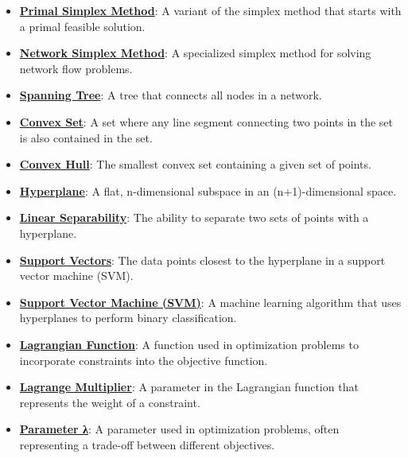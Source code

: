 \documentclass{article}%
\begin{document}
\begin{itemize}[leftmargin=*]
\item \href{https://www.math.purdue.edu/~yipn/421/2024-11-14-NetAppls.pdf#page=7}{\textbf{Primal Simplex Method}}: A variant of the simplex method that starts with a primal feasible solution.%
\item \href{https://www.math.purdue.edu/~yipn/421/2024-11-14-NetAppls.pdf#page=7}{\textbf{Network Simplex Method}}: A specialized simplex method for solving network flow problems.%
\item \href{https://www.math.purdue.edu/~yipn/421/2024-11-14-NetAppls.pdf#page=7}{\textbf{Spanning Tree}}: A tree that connects all nodes in a network.%
\item \href{https://www.math.purdue.edu/~yipn/421/2024-11-14-NetAppls.pdf#page=7}{\textbf{Convex Set}}: A set where any line segment connecting two points in the set is also contained in the set.%
\item \href{https://www.math.purdue.edu/~yipn/421/2024-11-14-NetAppls.pdf#page=7}{\textbf{Convex Hull}}: The smallest convex set containing a given set of points.%
\item \href{https://www.math.purdue.edu/~yipn/421/2024-11-14-NetAppls.pdf#page=7}{\textbf{Hyperplane}}: A flat, n-dimensional subspace in an (n+1)-dimensional space.%
\item \href{https://www.math.purdue.edu/~yipn/421/2024-11-14-NetAppls.pdf#page=7}{\textbf{Linear Separability}}: The ability to separate two sets of points with a hyperplane.%
\item \href{https://www.math.purdue.edu/~yipn/421/2024-11-14-NetAppls.pdf#page=7}{\textbf{Support Vectors}}: The data points closest to the hyperplane in a support vector machine (SVM).%
\item \href{https://www.math.purdue.edu/~yipn/421/2024-11-14-NetAppls.pdf#page=7}{\textbf{Support Vector Machine (SVM)}}: A machine learning algorithm that uses hyperplanes to perform binary classification.%
\item \href{https://www.math.purdue.edu/~yipn/421/2024-11-14-NetAppls.pdf#page=7}{\textbf{Lagrangian Function}}: A function used in optimization problems to incorporate constraints into the objective function.%
\item \href{https://www.math.purdue.edu/~yipn/421/2024-11-14-NetAppls.pdf#page=7}{\textbf{Lagrange Multiplier}}: A parameter in the Lagrangian function that represents the weight of a constraint.%
\item \href{https://www.math.purdue.edu/~yipn/421/2024-11-14-NetAppls.pdf#page=7}{\textbf{Parameter λ}}: A parameter used in optimization problems, often representing a trade-off between different objectives.%

\end{itemize}
\end{document}
